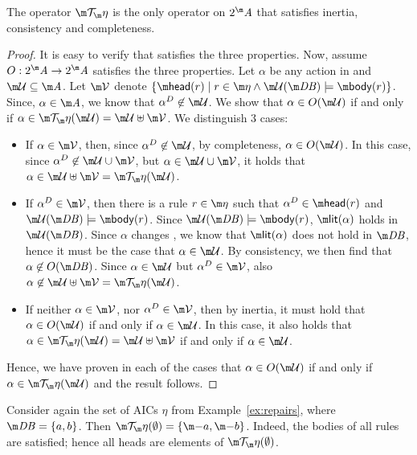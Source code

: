 \begin{proposition}
 The operator $\Op$ is the only operator on $2^\acts$ that satisfies inertia, consistency and completeness. 
\end{proposition}
\begin{proof}
 It is easy to verify that \Op satisfies the three properties. Now, assume $O: 2^\acts \to 2^\acts$ satisfies the three properties. Let $\alpha$ be any action in \acts and $\UU\subseteq \acts$. 
 Let $\VV$ denote $\{\head(r)\mid r\in \aics \land \UU(\db)\models\body(r)\}$. 
 Since, $\alpha \in \acts$, we know that $\alpha^D\not \in \UU$. We show that $\alpha \in O(\UU)$ if and only if $\alpha \in \Op(\UU) = \UU\uplus \VV $. 
 We distinguish 3 cases:
 \begin{itemize}
  \item If $\alpha \in \VV$, then, since $\alpha^D\not\in \UU$, by completeness, $\alpha \in O(\UU)$. In this case, since $\alpha^D\not \in \UU\cup \VV$, but $\alpha \in \UU\cup\VV$, it holds that $\alpha \in \UU \uplus \VV = \Op(\UU)$. 
  \item If $\alpha^D \in \VV$, then there is a rule $r\in \aics$ such that $\alpha^D\in \head(r)$ and $\UU(\db)\models \body(r)$. Since $\UU(\db)\models \body(r)$, $\litof(\alpha)$ holds in $\UU(\db)$. Since $\alpha$ changes \db, we know that $\litof(\alpha)$ does not hold in $\db$, hence it must be the case that $\alpha \in \UU$. By consistency, we then find that $\alpha\not\in O(\db)$. Since $\alpha \in \UU$ but $\alpha^D\in \VV$, also $\alpha\not\in \UU\uplus\VV=\Op(\UU)$.
  \item If neither $\alpha\in\VV$, nor $\alpha^D\in\VV$, then by inertia, it must hold that $\alpha \in O(\UU)$ if and only if $\alpha\in \UU$. In this case, it also holds that $\alpha \in \Op(\UU) = \UU \uplus\VV$ if and only if $\alpha \in \UU$.
  \end{itemize}
  Hence, we have proven in each of the cases that $\alpha \in O(\UU)$ if and only if $\alpha \in \Op(\UU)$ and the result follows. 
\end{proof}




\begin{example}
  Consider again the set of AICs $\eta$ from Example~\ref{ex:repairs}, where
  $\db=\{a,b\}$.
  Then $\Op(\emptyset)=\{\remove a, \remove b\}$. Indeed, the bodies of all rules are satisfied; hence all heads are elements of $\Op(\emptyset)$.
\end{example}

